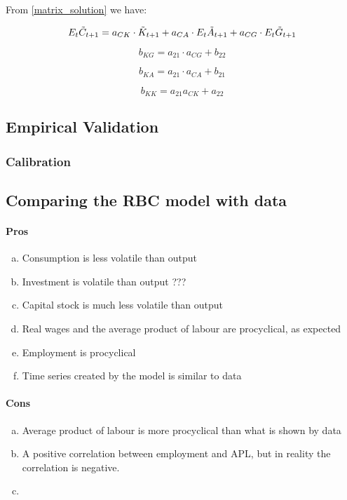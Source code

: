 From \ref{matrix_solution} we have:

$$
E_t \Tilde{C}_{t +1} = a_{CK} \cdot \Tilde{K}_{t + 1} + a_{CA} \cdot E_t \Tilde{A}_{t + 1} + a_{CG} \cdot E_t \Tilde{G}_{t + 1}
$$


$$
b _ { K G  } = a _ { 21 } \cdot a _ { CG } + b _ { 22 }
$$

$$
b _ { KA } = a _ { 2 1 } \cdot a _ { C A } + b _ { 21 }
$$


$$
b _ { KK } = a _ { 21 } a _ { CK } + a _ { 22 }
$$




\subsection{Empirical Validation}

\subsubsection{Calibration}

\subsection{Comparing the RBC model with data}

\paragraph{Pros}
\begin{enumerate}[(a)]
    \item Consumption is less volatile than output
    \item Investment is volatile than output ???
    \item Capital stock is much less volatile than output
    \item Real wages and the average product of labour are procyclical, as expected
    \item Employment is procyclical
    \item Time series created by the model is similar to data
\end{enumerate}

\paragraph{Cons}
\begin{enumerate}[(a)]
    \item Average product of labour is more procyclical than what is shown by data
    \item A positive correlation between employment and APL, but in reality the correlation is negative. 
    \item 

\end{enumerate}